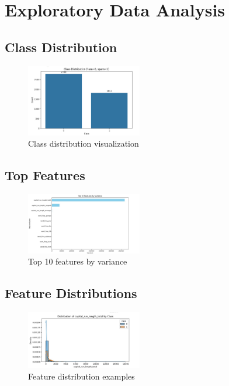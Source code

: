 \documentclass[12pt]{article}
\begin{document}
\section*{Exploratory Data Analysis}

\subsection*{Class Distribution}
\begin{figure}[H]
\centering
\includegraphics[width=0.45\textwidth]{class.jpeg}
\caption{Class distribution visualization}
\end{figure}

\subsection*{Top Features}
\begin{figure}[H]
\centering
\includegraphics[width=0.45\textwidth]{top.jpeg}
\caption{Top 10 features by variance}
\end{figure}

\subsection*{Feature Distributions}
\begin{figure}[H]
\centering
\includegraphics[width=0.45\textwidth]{feature.jpeg}
\caption{Feature distribution examples}
\end{figure}
\end{document}
